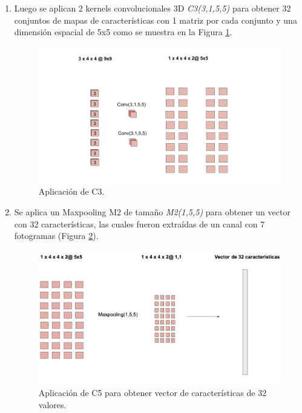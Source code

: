 \begin{onehalfspacing}
\begin{enumerate}
    \item Luego se aplican 2 kernels convolucionales 3D \textit{C3(3,1,5,5)} para obtener 32 conjuntos de mapas de características con 1 matriz por cada conjunto y una dimensión espacial de 5x5 como se muestra en la Figura \ref{fig:Fig_Piloto_C3}.
    \begin{figure}[h!]
	\centering
	\includegraphics[width=15cm,keepaspectratio]{XX_Figures/Fig_Piloto_C3.png}
	\caption{\footnotesize Aplicación de C3.}
	\label{fig:Fig_Piloto_C3}
    \end{figure}
    
    \item Se aplica un Maxpooling M2 de tamaño \textit{M2(1,5,5)} para obtener un vector con 32 características, las cuales fueron extraídas de un canal con 7 fotogramas (Figura \ref{fig:Fig_Piloto_p5}).
    \begin{figure}[h!]
	\centering
	\includegraphics[width=13cm,keepaspectratio]{XX_Figures/Fig_Piloto_p5.png}
	\caption{\footnotesize Aplicación de C5 para obtener vector de características de 32 valores.}
	\label{fig:Fig_Piloto_p5}
    \end{figure}
    

\end{enumerate}
\end{onehalfspacing}

